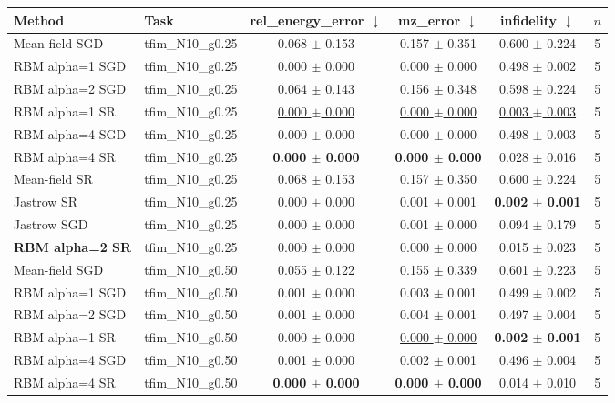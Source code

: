 \begin{tabular}{llcccc}
\toprule
Method & Task & rel\_energy\_error $\downarrow$ & mz\_error $\downarrow$ & infidelity $\downarrow$ & $n$ \\
\midrule
Mean-field SGD & tfim\_N10\_g0.25 & 0.068 $\pm$ 0.153 & 0.157 $\pm$ 0.351 & 0.600 $\pm$ 0.224 & 5 \\
RBM alpha=1 SGD & tfim\_N10\_g0.25 & 0.000 $\pm$ 0.000 & 0.000 $\pm$ 0.000 & 0.498 $\pm$ 0.002 & 5 \\
RBM alpha=2 SGD & tfim\_N10\_g0.25 & 0.064 $\pm$ 0.143 & 0.156 $\pm$ 0.348 & 0.598 $\pm$ 0.224 & 5 \\
RBM alpha=1 SR & tfim\_N10\_g0.25 & \underline{0.000 $\pm$ 0.000} & \underline{0.000 $\pm$ 0.000} & \underline{0.003 $\pm$ 0.003} & 5 \\
RBM alpha=4 SGD & tfim\_N10\_g0.25 & 0.000 $\pm$ 0.000 & 0.000 $\pm$ 0.000 & 0.498 $\pm$ 0.003 & 5 \\
RBM alpha=4 SR & tfim\_N10\_g0.25 & \textbf{0.000 $\pm$ 0.000} & \textbf{0.000 $\pm$ 0.000} & 0.028 $\pm$ 0.016 & 5 \\
Mean-field SR & tfim\_N10\_g0.25 & 0.068 $\pm$ 0.153 & 0.157 $\pm$ 0.350 & 0.600 $\pm$ 0.224 & 5 \\
Jastrow SR & tfim\_N10\_g0.25 & 0.000 $\pm$ 0.000 & 0.001 $\pm$ 0.001 & \textbf{0.002 $\pm$ 0.001} & 5 \\
Jastrow SGD & tfim\_N10\_g0.25 & 0.000 $\pm$ 0.000 & 0.001 $\pm$ 0.000 & 0.094 $\pm$ 0.179 & 5 \\
\textbf{RBM alpha=2 SR} & tfim\_N10\_g0.25 & 0.000 $\pm$ 0.000 & 0.000 $\pm$ 0.000 & 0.015 $\pm$ 0.023 & 5 \\
\midrule
Mean-field SGD & tfim\_N10\_g0.50 & 0.055 $\pm$ 0.122 & 0.155 $\pm$ 0.339 & 0.601 $\pm$ 0.223 & 5 \\
RBM alpha=1 SGD & tfim\_N10\_g0.50 & 0.001 $\pm$ 0.000 & 0.003 $\pm$ 0.001 & 0.499 $\pm$ 0.002 & 5 \\
RBM alpha=2 SGD & tfim\_N10\_g0.50 & 0.001 $\pm$ 0.000 & 0.004 $\pm$ 0.001 & 0.497 $\pm$ 0.004 & 5 \\
RBM alpha=1 SR & tfim\_N10\_g0.50 & 0.000 $\pm$ 0.000 & \underline{0.000 $\pm$ 0.000} & \textbf{0.002 $\pm$ 0.001} & 5 \\
RBM alpha=4 SGD & tfim\_N10\_g0.50 & 0.001 $\pm$ 0.000 & 0.002 $\pm$ 0.001 & 0.496 $\pm$ 0.004 & 5 \\
RBM alpha=4 SR & tfim\_N10\_g0.50 & \textbf{0.000 $\pm$ 0.000} & \textbf{0.000 $\pm$ 0.000} & 0.014 $\pm$ 0.010 & 5 \\

\end{tabular}
